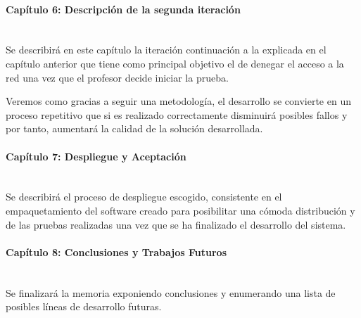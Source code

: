 \paragraph{Capítulo 6: Descripción de la segunda iteración} \ \\

Se describirá en este capítulo la iteración continuación a la explicada en el capítulo anterior que tiene como principal objetivo el de denegar el acceso a la red una vez que el profesor decide iniciar la prueba. 
\newline

Veremos como gracias a seguir una metodología, el desarrollo se convierte en un proceso repetitivo que si es realizado correctamente disminuirá posibles fallos y por tanto, aumentará la calidad de la solución desarrollada.


\paragraph{Capítulo 7: Despliegue y Aceptación} \ \\


Se describirá el proceso de despliegue escogido, consistente en el empaquetamiento del software creado para posibilitar una cómoda distribución y de las pruebas realizadas una vez que se ha finalizado el desarrollo del sistema.


\paragraph{Capítulo 8: Conclusiones y Trabajos Futuros} \ \\

Se finalizará la memoria exponiendo conclusiones y enumerando una lista de posibles líneas de desarrollo futuras.